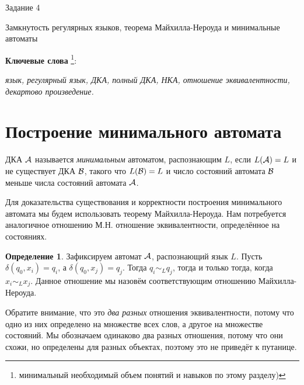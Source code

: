 \documentclass[12pt]{article}
\theoremstyle{definiton}
\theoremstyle{definition}
\theoremstyle{definition}
\newtheorem{Def}{Определение}
\def\A{{\cal A}}
\def\B{{\cal B}}
\begin{document}
\centerline{\LARGE Задание 4}

\medskip

\begin{center}
	{\Large Замкнутость регулярных языков, теорема Майхилла-Нероуда и минимальные автоматы}
\end{center}

\bigskip



{\bf Ключевые слова }\footnote{минимальный необходимый объем понятий и навыков по
этому разделу)}:{\em  язык, регулярный язык, ДКА, полный ДКА, НКА, отношение эквивалентности, декартово произведение.

}


\section{Построение минимального автомата}

ДКА $\A$ называется \emph{минимальным} автоматом, распознающим $L$, если $L(\A) = L$ и не существует ДКА $\B$, такого что $L(\B) = L$ и число состояний автомата $\B$ меньше числа состояний автомата $\A$.

Для доказательства существования и корректности построения минимального автомата мы будем использовать теорему Майхилла-Нероуда. Нам потребуется аналогичное отношению М.Н. отношение эквивалентности, определённое на состояниях.

\begin{Def}
Зафиксируем автомат $\A$, распознающий язык $L$. Пусть $\delta(q_0, x_i) = q_i$, а $\delta(q_0, x_j) = q_j$. Тогда $q_i \sim_L q_j$, тогда и только тогда, когда $x_i \sim_L x_j$.  Данное отношение мы назовём соответствующим отношению Майхилла-Нероуда.
\end{Def}

Обратите внимание, что это \emph{два разных} отношения эквивалентности, потому что одно из них определено на множестве всех слов, а другое на множестве состояний. Мы обозначаем одинаково два разных отношения, потому что они схожи, но определены для разных объектах, поэтому это не приведёт к путанице.
\end{document}
